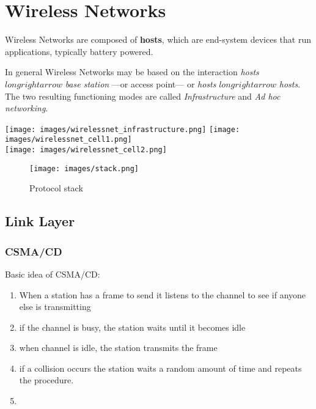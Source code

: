 \chapter{Wireless Networks}
Wireless Networks are composed of \textbf{hosts}, which are end-system devices that run
applications, typically battery powered.

In general Wireless Networks may be based on the interaction \textit{hosts} $longrightarrow$ \textit{base station} ---or access point--- or \textit{hosts} $longrightarrow$ \textit{hosts}.
The two resulting functioning modes are called \textit{Infrastructure} and \textit{Ad hoc networking}.

\begin{paracol}{2}
   \colfill
   \texttt{[image: images/wirelessnet\_infrastructure.png]}
   \colfill
   \switchcolumn
   \colfill
   \texttt{[image: images/wirelessnet\_cell1.png]}\\
   \texttt{[image: images/wirelessnet\_cell2.png]}
   \colfill
\end{paracol}

\begin{figure}[htbp]
   \centering
   \texttt{[image: images/stack.png]}
   \caption{Protocol stack}
   \label{fig:stack}
\end{figure}

\section{Link Layer}
\subsection{CSMA/CD}
Basic idea of CSMA/CD:
\begin{enumerate}
   \item When a station has a frame to send it listens to
   the channel to see if anyone else is transmitting
   \item if the channel is busy, the station waits until it
   becomes idle
   \item when channel is idle, the station transmits the
   frame
   \item if a collision occurs the station waits a random
   amount of time and repeats the procedure.
   \item[]
\end{enumerate}

